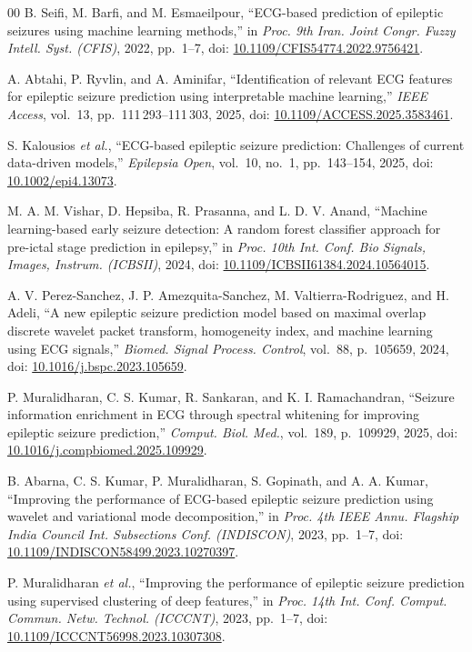 \documentclass[conference,a4paper]{IEEEtran}
\begin{document}
\newcommand{\doi}[1]{doi: \href{https://doi.org/#1}{#1}}

\begin{thebibliography}{00}
 B. Seifi, M. Barfi, and M. Esmaeilpour, ``ECG-based
prediction of epileptic seizures using machine learning methods,'' in
\textit{Proc. 9th Iran. Joint Congr. Fuzzy Intell. Syst. (CFIS)}, 2022,
pp.~1--7, \doi{10.1109/CFIS54774.2022.9756421}.

 A. Abtahi, P. Ryvlin, and A. Aminifar,
``Identification of relevant ECG features for epileptic seizure prediction
using interpretable machine learning,'' \textit{IEEE Access}, vol.~13,
pp.~111\,293--111\,303, 2025, \doi{10.1109/ACCESS.2025.3583461}.

 S. Kalousios \textit{et al.}, ``ECG-based epileptic
seizure prediction: Challenges of current data-driven models,''
\textit{Epilepsia Open}, vol.~10, no.~1, pp.~143--154, 2025,
\doi{10.1002/epi4.13073}.

 M. A. M. Vishar, D. Hepsiba, R. Prasanna, and L. D. V.
Anand, ``Machine learning-based early seizure detection: A random forest
classifier approach for pre-ictal stage prediction in epilepsy,'' in
\textit{Proc. 10th Int. Conf. Bio Signals, Images, Instrum. (ICBSII)}, 2024,
\doi{10.1109/ICBSII61384.2024.10564015}.

 A. V. Perez-Sanchez, J. P. Amezquita-Sanchez, M.
Valtierra-Rodriguez, and H. Adeli, ``A new epileptic seizure prediction model
based on maximal overlap discrete wavelet packet transform, homogeneity
index, and machine learning using ECG signals,'' \textit{Biomed. Signal
Process. Control}, vol.~88, p.~105659, 2024,
\doi{10.1016/j.bspc.2023.105659}.

 P. Muralidharan, C. S. Kumar, R. Sankaran, and
K. I. Ramachandran, ``Seizure information enrichment in ECG through spectral
whitening for improving epileptic seizure prediction,'' \textit{Comput.
Biol. Med.}, vol.~189, p.~109929, 2025,
\doi{10.1016/j.compbiomed.2025.109929}.

 B. Abarna, C. S. Kumar, P. Muralidharan, S. Gopinath,
and A. A. Kumar, ``Improving the performance of ECG-based epileptic seizure
prediction using wavelet and variational mode decomposition,'' in
\textit{Proc. 4th IEEE Annu. Flagship India Council Int. Subsections Conf.
(INDISCON)}, 2023, pp.~1--7, \doi{10.1109/INDISCON58499.2023.10270397}.

 P. Muralidharan \textit{et al.}, ``Improving the
performance of epileptic seizure prediction using supervised clustering of
deep features,'' in \textit{Proc. 14th Int. Conf. Comput. Commun. Netw.
Technol. (ICCCNT)}, 2023, pp.~1--7,
\doi{10.1109/ICCCNT56998.2023.10307308}.


\end{thebibliography}
\end{document}

